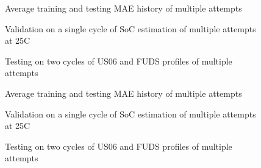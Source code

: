 \begin{figure*}[htbp]
    \centering
    \begin{subfigure}[b]{0.325\textwidth}
        \centering
        
        \caption{Average training and testing MAE history of multiple attempts}
    \end{subfigure}
    \hfill
    \begin{subfigure}[b]{0.325\textwidth}
        \centering
        
        \caption{Validation on a single cycle of SoC estimation of multiple attempts at 25\textdegree{}C}
    \end{subfigure}
    \hfill
    \begin{subfigure}[b]{0.325\textwidth}
        \centering
        
        \caption{Testing on two cycles of US06 and FUDS profiles of multiple attempts}
        \label{subfig:Model-1res-DSTvsFUDS}
    \end{subfigure}
    \begin{subfigure}[b]{0.325\textwidth}
        \centering
        
        \caption{Average training and testing MAE history of multiple attempts}
    \end{subfigure}
    \hfill
    \begin{subfigure}[b]{0.325\textwidth}
        \centering
        
        \caption{Validation on a single cycle of SoC estimation of multiple attempts at 25\textdegree{}C}
    \end{subfigure}
    \hfill
    \begin{subfigure}[b]{0.325\textwidth}
        \centering
        
        \caption{Testing on two cycles of US06 and FUDS profiles of multiple attempts}
    \end{subfigure}
    \begin{subfigure}[b]{0.325\textwidth}
        \centering

\end{subfigure}
\end{figure*}
